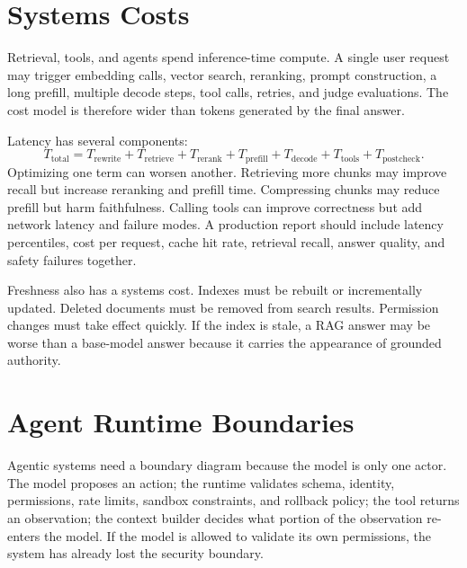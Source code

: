 \section{Systems Costs}
\label{sec:rag-agent-systems-costs}

Retrieval, tools, and agents spend inference-time compute. A single user request may trigger embedding calls, vector search, reranking, prompt construction, a long prefill, multiple decode steps, tool calls, retries, and judge evaluations. The cost model is therefore wider than tokens generated by the final answer.

Latency has several components:
\begin{equation}
  T_{\mathrm{total}} =
  T_{\mathrm{rewrite}} + T_{\mathrm{retrieve}} + T_{\mathrm{rerank}} +
  T_{\mathrm{prefill}} + T_{\mathrm{decode}} + T_{\mathrm{tools}} + T_{\mathrm{postcheck}}.
  \label{eq:rag-latency}
\end{equation}
Optimizing one term can worsen another. Retrieving more chunks may improve recall but increase reranking and prefill time. Compressing chunks may reduce prefill but harm faithfulness. Calling tools can improve correctness but add network latency and failure modes. A production report should include latency percentiles, cost per request, cache hit rate, retrieval recall, answer quality, and safety failures together.

Freshness also has a systems cost. Indexes must be rebuilt or incrementally updated. Deleted documents must be removed from search results. Permission changes must take effect quickly. If the index is stale, a RAG answer may be worse than a base-model answer because it carries the appearance of grounded authority.

\section{Agent Runtime Boundaries}
\label{sec:agent-runtime-boundaries}

Agentic systems need a boundary diagram because the model is only one actor. The model proposes an action; the runtime validates schema, identity, permissions, rate limits, sandbox constraints, and rollback policy; the tool returns an observation; the context builder decides what portion of the observation re-enters the model. If the model is allowed to validate its own permissions, the system has already lost the security boundary.

